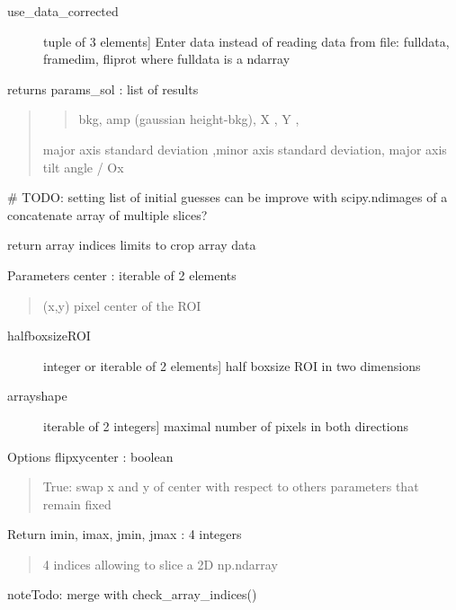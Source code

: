 \documentclass[letterpaper,10pt,english]{sphinxmanual}
\begin{document}
\begin{fulllineitems}
\begin{description}
\item[{use\_data\_corrected}] \leavevmode{[}tuple of 3 elements{]}
Enter data instead of reading data from file:
fulldata, framedim, fliprot
where fulldata is a ndarray

\end{description}

returns
params\_sol : list of results
\begin{quote}
\begin{quote}

bkg,  amp  (gaussian height-bkg), X , Y ,
\end{quote}

major axis standard deviation ,minor axis standard deviation,
major axis tilt angle / Ox
\end{quote}

\# TODO: setting list of initial guesses can be improve with
scipy.ndimages of a concatenate array of multiple slices?

\end{fulllineitems}


\begin{fulllineitems}
\label{\detokenize{PeakSearch:LaueTools.readmccd.getindices2cropArray}}
return array indices limits to crop array data

Parameters
center : iterable of 2 elements
\begin{quote}

(x,y) pixel center of the ROI
\end{quote}
\begin{description}
\item[{halfboxsizeROI}] \leavevmode{[}integer or iterable of 2 elements{]}
half boxsize ROI in two dimensions

\item[{arrayshape}] \leavevmode{[}iterable of 2 integers{]}
maximal number of pixels in both directions

\end{description}

Options
flipxycenter : boolean
\begin{quote}

True: swap x and y of center with respect to others
parameters that remain fixed
\end{quote}

Return
imin, imax, jmin, jmax : 4 integers
\begin{quote}

4 indices allowing to slice a 2D np.ndarray
\end{quote}

\begin{sphinxadmonition}{note}{\label{PeakSearch:index-0}Todo:}
merge with check\_array\_indices()
\end{sphinxadmonition}

\end{fulllineitems}
\end{document}
